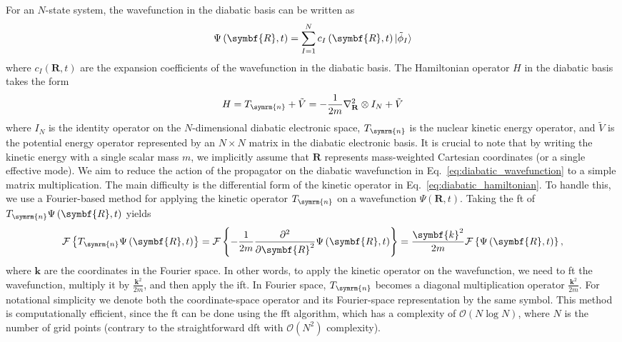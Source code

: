 For an $N$-state system, the wavefunction in the diabatic basis can be written as
\begin{equation}\label{eq:diabatic_wavefunction}
\Psi\left(\symbf{R},t\right)=\sum_{I=1}^N c_I\left(\symbf{R},t\right)\ket{\tilde\phi_I}
\end{equation}
where $c_I\left(\symbf{R},t\right)$ are the expansion coefficients of the wavefunction in the diabatic basis. The Hamiltonian operator $H$ in the diabatic basis takes the form
\begin{equation}\label{eq:diabatic_hamiltonian}
H=T_{\symrm{n}}+\tilde{V}=-\frac{1}{2m}\nabla_\mathbf{R}^2\otimes I_N+\tilde{V}
\end{equation}
where $I_N$ is the identity operator on the $N$-dimensional diabatic electronic space, $T_{\symrm{n}}$ is the nuclear kinetic energy operator, and $\tilde{V}$ is the potential energy operator represented by an $N\times N$ matrix in the diabatic electronic basis. It is crucial to note that by writing the kinetic energy with a single scalar mass $m$, we implicitly assume that $\symbf{R}$ represents mass-weighted Cartesian coordinates (or a single effective mode). We aim to reduce the action of the propagator on the diabatic wavefunction in Eq.~\eqref{eq:diabatic_wavefunction} to a simple matrix multiplication. The main difficulty is the differential form of the kinetic operator in Eq.~\eqref{eq:diabatic_hamiltonian}. To handle this, we use a Fourier-based method for applying the kinetic operator $T_{\symrm{n}}$ on a wavefunction $\Psi\left(\symbf{R},t\right)$. Taking the \gls{ft} of $T_{\symrm{n}}\Psi\left(\symbf{R},t\right)$ yields
\begin{equation}\label{eq:kinetic_fourier_method}
\mathcal{F}\left\lbrace T_{\symrm{n}}\Psi\left(\symbf{R},t\right)\right\rbrace=\mathcal{F}\left\lbrace-\frac{1}{2m}\frac{\partial^2}{\partial\symbf{R}^2}\Psi\left(\symbf{R},t\right)\right\rbrace=\frac{\symbf{k}^2}{2m}\mathcal{F}\left\lbrace\Psi\left(\symbf{R},t\right)\right\rbrace,
\end{equation}
where $\symbf{k}$ are the coordinates in the Fourier space. In other words, to apply the kinetic operator on the wavefunction, we need to \gls{ft} the wavefunction, multiply it by $\frac{\symbf{k}^2}{2m}$, and then apply the \gls{ift}. In Fourier space, $T_{\symrm{n}}$ becomes a diagonal multiplication operator $\frac{\symbf{k}^2}{2m}$. For notational simplicity we denote both the coordinate-space operator and its Fourier-space representation by the same symbol. This method is computationally efficient, since the \gls{ft} can be done using the \gls{fft} algorithm, which has a complexity of $\mathcal{O}(N\log N)$, where $N$ is the number of grid points (contrary to the straightforward \gls{dft} with $\mathcal{O}(N^2)$ complexity).

